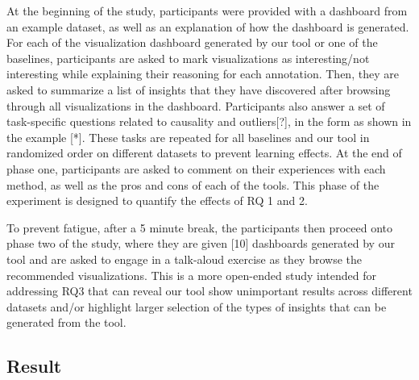 \par At the beginning of the study, participants were provided with a dashboard from an example dataset, as well as an explanation of how the dashboard is generated. For each of the visualization dashboard generated by our tool or one of the baselines, participants are asked to mark visualizations as interesting/not interesting while explaining their reasoning for each annotation. Then, they are asked to summarize a list of insights that they have discovered after browsing through all visualizations in the dashboard. Participants also answer a set of task-specific questions related to causality and outliers[?], in the form as shown in the example [*]. These tasks are repeated for all baselines and our tool in randomized order on different datasets to prevent learning effects. At the end of phase one, participants are asked to comment on their experiences with each method, as well as the pros and cons of each of the tools. This phase of the experiment is designed to quantify the effects of RQ 1 and 2. 
\par To prevent fatigue, after a 5 minute break, the participants then proceed onto phase two of the study, where they are given [10] dashboards generated by our tool and are asked to engage in a talk-aloud exercise as they browse the recommended visualizations. This is a more open-ended study intended for addressing RQ3 that can reveal our tool show unimportant results across different datasets and/or highlight larger selection of the types of insights that can be generated from the tool. 
\subsection{Result}